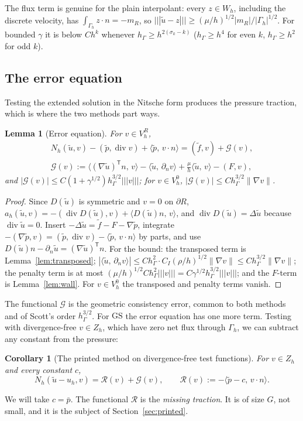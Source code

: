 \documentclass[pdflatex,sn-mathphys-num]{sn-jnl}
\theoremstyle{thmstyleone}
\newtheorem{lemma}[theorem]{Lemma}
\newtheorem{corollary}[theorem]{Corollary}
\theoremstyle{thmstylethree}
\newcommand{\hG}{h_\Gamma}
\newcommand{\Gh}{\Gamma_h}
\newcommand{\VR}{V_h^R}
\newcommand{\VO}{V_h^0}
\newcommand{\Zh}{Z_h}
\newcommand{\Wh}{W_h}
\newcommand{\dn}{\partial_n}
\newcommand{\ut}{\tilde u}
\newcommand{\pt}{\tilde p}
\newcommand{\ft}{\tilde f}
\newcommand{\pbar}{\bar p}
\newcommand{\ip}[2]{\langle #1,\, #2\rangle}
\newcommand{\tnorm}[1]{|\!|\!|#1|\!|\!|}
\newcommand{\norm}[1]{\lVert #1\rVert}
\newcommand{\GS}{\mathrm{GS}}
\renewcommand{\div}{\operatorname{div}}
\newcommand{\Rc}{\mathcal R}
\newcommand{\Gc}{\mathcal G}
\begin{document}
The flux term is genuine for the plain interpolant: every $z\in\Wh$, including the discrete velocity, has $\int_{\Gh}z\cdot n=-m_R$, so $\tnorm{\ut-z}\ge(\mu/h)^{1/2}|m_R|/|\Gh|^{1/2}$. For bounded $\gamma$ it is below $Ch^k$ whenever $\hG\ge h^{2(\sigma_k-k)}$ ($\hG\ge h^4$ for even $k$, $\hG\ge h^2$ for odd $k$).

\subsection{The error equation}
Testing the extended solution in the Nitsche form produces the pressure traction, which is where the two methods part ways.

\begin{lemma}[Error equation]\label{lem:erroreq}
For $v\in\VR$,
\begin{gather*}
N_h(\ut,v)-(\pt,\div v)+\ip{\pt}{v\cdot n}=(\ft,v)+\Gc(v),\\
\Gc(v):=\ip{(\nabla\ut)^{\mathsf T}n}{v}-\ip{\ut}{\dn v}+\frac\mu h\ip{\ut}{v}-(F,v),
\end{gather*}
and $|\Gc(v)|\le C(1+\gamma^{1/2})\hG^{3/2}\tnorm v$; for $v\in\VO$, $|\Gc(v)|\le C\hG^{3/2}\norm{\nabla v}$.
\end{lemma}

\begin{proof}
Since $D(\ut)$ is symmetric and $v=0$ on $\partial R$, $a_h(\ut,v)=-(\div D(\ut),v)+\ip{D(\ut)n}{v}$, and $\div D(\ut)=\Delta\ut$ because $\div\ut=0$. Insert $-\Delta\ut=\ft-F-\nabla\pt$, integrate $-(\nabla\pt,v)=(\pt,\div v)-\ip{\pt}{v\cdot n}$ by parts, and use $D(\ut)n-\dn\ut=(\nabla\ut)^{\mathsf T}n$. For the bound: the transposed term is Lemma~\ref{lem:transposed}; $|\ip{\ut}{\dn v}|\le C\hG^2\cdot C_I(\rho/h)^{1/2}\norm{\nabla v}\le C\hG^{3/2}\norm{\nabla v}$; the penalty term is at most $(\mu/h)^{1/2}C\hG^2\tnorm v=C\gamma^{1/2}\hG^{3/2}\tnorm v$; and the $F$-term is Lemma~\ref{lem:wall}. For $v\in\VO$ the transposed and penalty terms vanish.
\end{proof}

The functional $\Gc$ is the geometric consistency error, common to both methods and of Scott's order $\hG^{3/2}$. For $\GS$ the error equation has one more term. Testing with divergence-free $v\in\Zh$, which have zero net flux through $\Gh$, we can subtract any constant from the pressure:

\begin{corollary}[The printed method on divergence-free test functions]\label{cor:GSerr}
For $v\in\Zh$ and every constant $c$,
\[
N_h(\ut-u_h,v)=\Rc(v)+\Gc(v),\qquad \Rc(v):=-\ip{\pt-c}{v\cdot n}.
\]
\end{corollary}
We will take $c=\pbar$. The functional $\Rc$ is the \emph{missing traction}. It is of size $G$, not small, and it is the subject of Section~\ref{sec:printed}.
\end{document}
